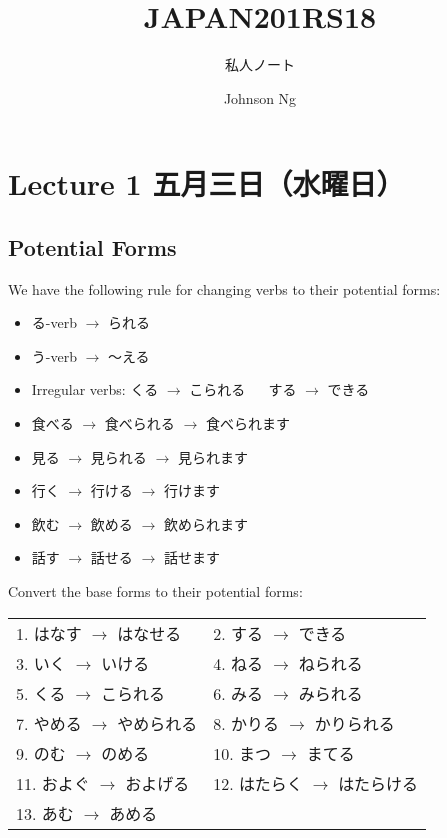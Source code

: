 \documentclass[notoc,notitlepage]{tufte-book}
\title{JAPAN201RS18}
\author{Johnson Ng}
\subtitle{私人ノート}
\begin{document}
\hypersetup{pageanchor=false}
\maketitle
\hypersetup{pageanchor=true}
\tableofcontents

\chapter{Lecture 1 五月三日（水曜日）}
  \label{chapter:lecture_1_may_03rd_2018}

\section{Potential Forms} %
\label{sec:potential_forms}

We have the following rule for changing verbs to their potential forms:
\begin{itemize}
  \item る-verb $\to$ られる 
  \item う-verb $\to$ 〜える 
  \item Irregular verbs: くる $\to$ こられる $\quad$ する $\to$ できる
\end{itemize}

\begin{eg}
  \begin{itemize}
    \item 食べる $\to$ 食べられる $\to$ 食べられます
    \item 見る $\to$ 見られる $\to$ 見られます
  \end{itemize}
  
\noindent{}
  \begin{itemize}
    \item 行く $\to$ 行ける $\to$ 行けます
    \item 飲む $\to$ 飲める $\to$ 飲められます
    \item 話す $\to$ 話せる $\to$ 話せます
  \end{itemize}
\end{eg}

\begin{ex}
Convert the base forms to their potential forms:  \\
  \begin{tabular}{l l}
    1. はなす $\to$ はなせる   & 2. する $\to$ できる \\
    3. いく $\to$ いける       & 4. ねる $\to$ ねられる \\
    5. くる $\to$ こられる     & 6. みる $\to$ みられる \\
    7. やめる $\to$ やめられる & 8. かりる $\to$ かりられる \\
    9. のむ $\to$ のめる       & 10. まつ $\to$ まてる \\
    11. およぐ $\to$ およげる  & 12. はたらく $\to$ はたらける \\
    13. あむ $\to$ あめる
  \end{tabular}
\end{ex}
\end{document}
